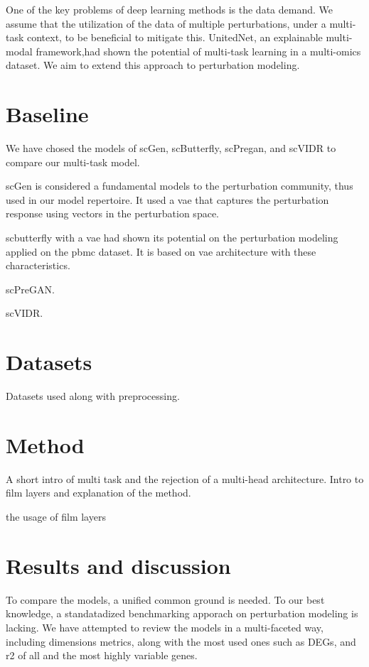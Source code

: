\documentclass[12pt, a4paper]{report}
\begin{document}
One of the key problems of deep learning methods is the data demand. We assume that the utilization of the data of multiple perturbations, under a multi-task context, to be beneficial to mitigate this. UnitedNet, an explainable multi-modal framework,had shown the potential of multi-task learning in a multi-omics dataset. We aim to extend this approach to perturbation modeling.


\section{Baseline}

We have chosed the models of scGen, scButterfly, scPregan, and scVIDR to compare our multi-task model.

scGen is considered a fundamental models to the perturbation community, thus used in our model repertoire. It used a vae that captures the perturbation response using vectors in the perturbation space.

scbutterfly with a vae had shown its potential on the perturbation modeling applied on the pbmc dataset. It is based on vae architecture with these characteristics.

scPreGAN.

scVIDR.

\section{Datasets}

Datasets used along with preprocessing.

\section{Method}

A short intro of multi task and the rejection of a multi-head architecture. Intro to film layers and explanation of the method.

the usage of film layers


\section{Results and discussion}

To compare the models, a unified common ground is needed. To our best knowledge, a standatadized benchmarking apporach on perturbation modeling is lacking. We have attempted to review the models in a multi-faceted way, including dimensions metrics, along with the most used ones such as DEGs, and r2 of all and the most highly variable genes.
\end{document}
